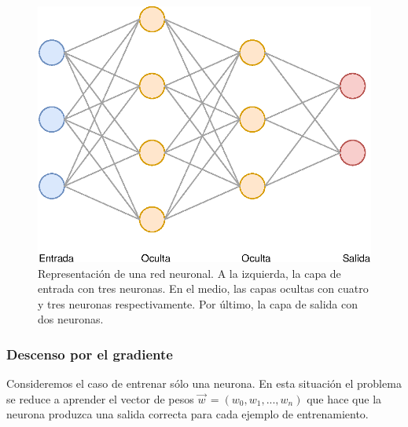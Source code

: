 \documentclass[spanish]{report}
\begin{document}
\begin{figure}[H]
\centering
 \includegraphics[width=\linewidth]{RNA.eps}
  \caption{Representación de una red neuronal. A la izquierda, la capa de entrada con tres neuronas. En el medio, las capas ocultas con cuatro y tres neuronas respectivamente. Por último, la capa de salida con dos neuronas.}
   \label{fig:red_neuronal_capas}
\end{figure}




\subsubsection{Descenso por el gradiente}

Consideremos el caso de entrenar sólo una neurona. En esta situación el problema se reduce a aprender el vector de pesos $\vec{w}^{\,} = (w_0, w_1, ..., w_n)$ que hace que la neurona produzca una salida correcta para cada ejemplo de entrenamiento.
\end{document}
